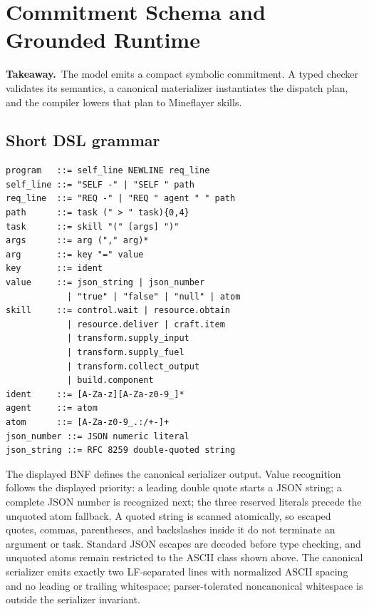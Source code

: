 \documentclass[10pt]{article}
\newcommand{\takeaway}[1]{\par\smallskip\noindent\textcolor{GCNavy}{\textbf{Takeaway.}}~#1\par\smallskip}
\begin{document}
\section{Commitment Schema and Grounded Runtime}
\label{sec:supp-runtime}

\takeaway{The model emits a compact symbolic commitment. A typed checker validates its semantics, a canonical materializer instantiates the dispatch plan, and the compiler lowers that plan to Mineflayer skills.}

\subsection{Short DSL grammar}

\begin{lstlisting}[style=gcpdsl]
program   ::= self_line NEWLINE req_line
self_line ::= "SELF -" | "SELF " path
req_line  ::= "REQ -" | "REQ " agent " " path
path      ::= task (" > " task){0,4}
task      ::= skill "(" [args] ")"
args      ::= arg ("," arg)*
arg       ::= key "=" value
key       ::= ident
value     ::= json_string | json_number
            | "true" | "false" | "null" | atom
skill     ::= control.wait | resource.obtain
            | resource.deliver | craft.item
            | transform.supply_input
            | transform.supply_fuel
            | transform.collect_output
            | build.component
ident     ::= [A-Za-z][A-Za-z0-9_]*
agent     ::= atom
atom      ::= [A-Za-z0-9_.:/+-]+
json_number ::= JSON numeric literal
json_string ::= RFC 8259 double-quoted string
\end{lstlisting}

The displayed BNF defines the canonical serializer output. Value recognition follows the displayed priority: a leading double quote starts a JSON string; a complete JSON number is recognized next; the three reserved literals precede the unquoted atom fallback. A quoted string is scanned atomically, so escaped quotes, commas, parentheses, and backslashes inside it do not terminate an argument or task. Standard JSON escapes are decoded before type checking, and unquoted atoms remain restricted to the ASCII class shown above. The canonical serializer emits exactly two LF-separated lines with normalized ASCII spacing and no leading or trailing whitespace; parser-tolerated noncanonical whitespace is outside the serializer invariant.
\end{document}
